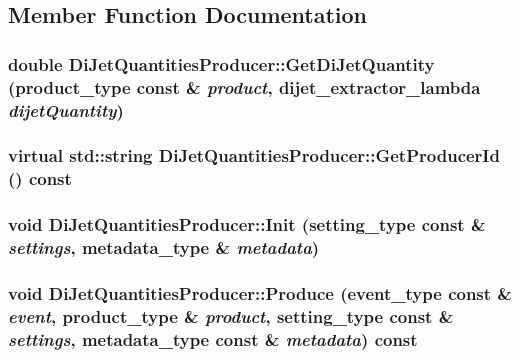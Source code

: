 \subsection{Member Function Documentation}
\hypertarget{classDiJetQuantitiesProducer_a11fe61b81d216c394cf0dfcdd6935ba0}{
\subsubsection[{GetDiJetQuantity}]{\setlength{\rightskip}{0pt plus 5cm}double DiJetQuantitiesProducer::GetDiJetQuantity (product\_\-type const \& {\em product}, \/  {\bf dijet\_\-extractor\_\-lambda} {\em dijetQuantity})}}
\label{classDiJetQuantitiesProducer_a11fe61b81d216c394cf0dfcdd6935ba0}
\hypertarget{classDiJetQuantitiesProducer_a9fce10c46aed19eabf7bce163b9b129d}{
\subsubsection[{GetProducerId}]{\setlength{\rightskip}{0pt plus 5cm}virtual std::string DiJetQuantitiesProducer::GetProducerId () const}}
\label{classDiJetQuantitiesProducer_a9fce10c46aed19eabf7bce163b9b129d}
\hypertarget{classDiJetQuantitiesProducer_aab4d47b6a70353c6c37f15f461dd97b1}{
\subsubsection[{Init}]{\setlength{\rightskip}{0pt plus 5cm}void DiJetQuantitiesProducer::Init (setting\_\-type const \& {\em settings}, \/  metadata\_\-type \& {\em metadata})}}
\label{classDiJetQuantitiesProducer_aab4d47b6a70353c6c37f15f461dd97b1}
\hypertarget{classDiJetQuantitiesProducer_a94dddcf5600c7c6d97d14c86b44115da}{
\subsubsection[{Produce}]{\setlength{\rightskip}{0pt plus 5cm}void DiJetQuantitiesProducer::Produce (event\_\-type const \& {\em event}, \/  product\_\-type \& {\em product}, \/  setting\_\-type const \& {\em settings}, \/  metadata\_\-type const \& {\em metadata}) const}}
\label{classDiJetQuantitiesProducer_a94dddcf5600c7c6d97d14c86b44115da}


